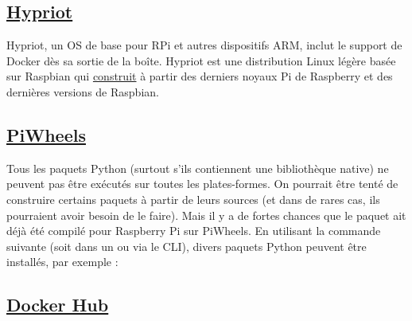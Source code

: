{\subsection{\href{https://blog.hypriot.com/}{Hypriot}}\label{subsec:hypriot}

Hypriot, un OS de base pour RPi et autres dispositifs ARM, inclut le support de Docker dès sa sortie de la boîte. Hypriot est une distribution Linux légère basée sur Raspbian qui \href{https://github.com/hypriot/image-builder-rpi}{construit} à partir des derniers noyaux Pi de Raspberry et des dernières versions de Raspbian.

\subsection{\href{https://www.piwheels.org/}{PiWheels}}

Tous les paquets Python (surtout s'ils contiennent une bibliothèque native) ne peuvent pas être exécutés sur toutes les plates-formes. On pourrait être tenté de construire certains paquets à partir de leurs sources (et dans de rares cas, ils pourraient avoir besoin de le faire). Mais il y a de fortes chances que le paquet ait déjà été compilé pour Raspberry Pi sur PiWheels. En utilisant la commande suivante (soit dans un  ou via le CLI), divers paquets Python peuvent être installés, par exemple  :
%

\subsection{\href{https://hub.docker.com/}{Docker Hub}}\label{subsec:docker_hub}

}
